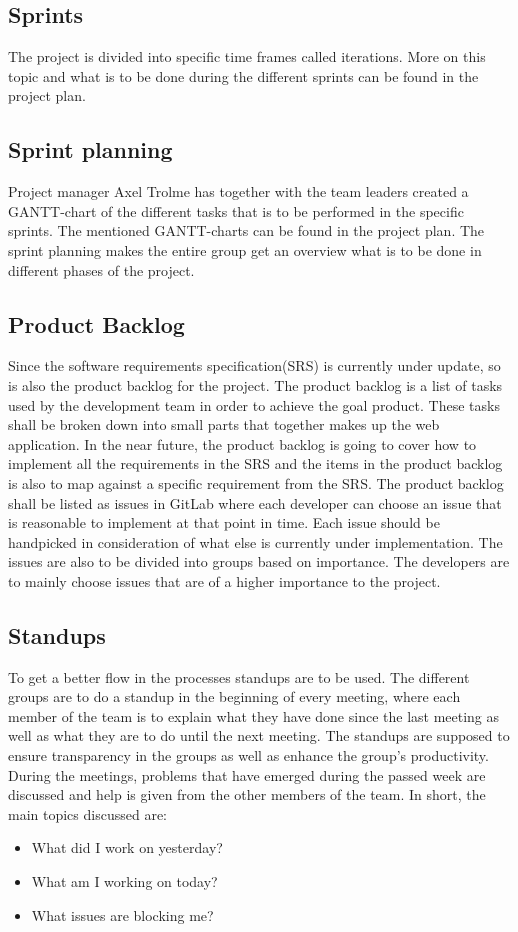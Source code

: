 \subsection{Sprints}
The project is divided into specific time frames called iterations. More on this topic and what is to be done during the different sprints can be found in the project plan. 

\subsection{Sprint planning}
Project manager Axel Trolme has together with the team leaders created a GANTT-chart of the different tasks that is to be performed in the specific sprints. The mentioned GANTT-charts can be found in the project plan. The sprint planning makes the entire group get an overview what is to be done in different phases of the project. 

\subsection{Product Backlog}
Since the software requirements specification(SRS) is currently under update, so is also the product backlog for the project. The product backlog is a list of tasks used by the development team in order to achieve the goal product. These tasks shall be broken down into small parts that together makes up the web application. In the near future, the product backlog is going to cover how to implement all the requirements in the SRS and the items in the product backlog is also to map against a specific requirement from the SRS. The product backlog shall be listed as issues in GitLab where each developer can choose an issue that is reasonable to implement at that point in time. Each issue should be handpicked in consideration of what else is currently under implementation. The issues are also to be divided into groups based on importance. The developers are to mainly choose issues that are of a higher importance to the project.  

\subsection{Standups}
To get a better flow in the processes standups are to be used. The different groups are to do a standup in the beginning of every meeting, where each member of the team is to explain what they have done since the last meeting as well as what they are to do until the next meeting. The standups are supposed to ensure transparency in the groups as well as enhance the group's productivity. During the meetings, problems that have emerged during the passed week are discussed and help is given from the other members of the team. In short, the main topics discussed are: 
\begin{itemize}
    \item What did I work on yesterday?
    \item What am I working on today?
    \item What issues are blocking me?
\end{itemize}

